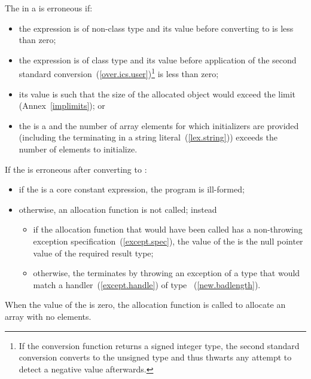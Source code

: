 \pnum
{}%
The  in a  is
erroneous if:

\begin{itemize}
\item
the expression is of non-class type and its value before converting to
 is less than zero;

\item
the expression is of class type and its value before application of the second
standard conversion~(\ref{over.ics.user})\footnote{If the conversion function
returns a signed integer type, the second standard conversion converts to the
unsigned type  and thus thwarts any attempt to detect a
negative value afterwards.} is less than zero;

\item
its value is such that the size of the allocated object would exceed the
 limit (Annex~\ref{implimits}); or

\item
the  is a  and the
number of array elements for which initializers are provided (including the
terminating  in a string literal~(\ref{lex.string})) exceeds the
number of elements to initialize.
\end{itemize}

If the  is erroneous after converting to :
\begin{itemize}
\item
if the  is a core constant expression,
the program is ill-formed;
\item
otherwise, an allocation function is not called; instead
\begin{itemize}
\item
if the allocation function that would have been called
has a non-throwing exception specification~(\ref{except.spec}),
the value of the 
is the null pointer value of the required result type;
\item
otherwise, the  terminates by throwing an
exception of a type that would match a handler~(\ref{except.handle}) of type
~(\ref{new.badlength}).
\end{itemize}
\end{itemize}
When the value of the  is zero, the allocation
function is called to allocate an array with no elements.


